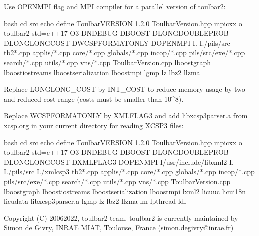 \documentclass[letterpaper,10pt,openany,oneside,english]{sphinxmanual}
\begin{document}
\sphinxAtStartPar
Use OPENMPI flag and MPI compiler for a parallel version of toulbar2:

\begin{sphinxVerbatim}[commandchars=\\\{\}]
bash
cd src
echo \PYGZsq{}\PYGZsh{}define Toulbar\PYGZus{}VERSION \PYGZdq{}1.2.0\PYGZdq{}\PYGZsq{} \PYGZgt{} ToulbarVersion.hpp
mpicxx \PYGZhy{}o toulbar2 \PYGZhy{}std=c++17 \PYGZhy{}O3 \PYGZhy{}DNDEBUG \PYGZhy{}DBOOST \PYGZhy{}DLONGDOUBLE\PYGZus{}PROB \PYGZhy{}DLONGLONG\PYGZus{}COST \PYGZhy{}DWCSPFORMATONLY \PYGZhy{}DOPENMPI \PYGZbs{}
 \PYGZhy{}I. \PYGZhy{}I./pils/src tb2*.cpp applis/*.cpp core/*.cpp globals/*.cpp incop/*.cpp pils/src/exe/*.cpp search/*.cpp utils/*.cpp vns/*.cpp ToulbarVersion.cpp \PYGZbs{}
 \PYGZhy{}lboost\PYGZus{}graph \PYGZhy{}lboost\PYGZus{}iostreams \PYGZhy{}lboost\PYGZus{}serialization \PYGZhy{}lboost\PYGZus{}mpi \PYGZhy{}lgmp \PYGZhy{}lz \PYGZhy{}lbz2 \PYGZhy{}llzma
\end{sphinxVerbatim}

\sphinxAtStartPar
Replace LONGLONG\_COST by INT\_COST to reduce memory usage by two and reduced cost range (costs must be smaller than 10\textasciicircum{}8).

\sphinxAtStartPar
Replace WCSPFORMATONLY by XMLFLAG3 and add libxcsp3parser.a from xcsp.org in your current directory for reading XCSP3 files:

\begin{sphinxVerbatim}[commandchars=\\\{\}]
bash
cd src
echo \PYGZsq{}\PYGZsh{}define Toulbar\PYGZus{}VERSION \PYGZdq{}1.2.0\PYGZdq{}\PYGZsq{} \PYGZgt{} ToulbarVersion.hpp
mpicxx \PYGZhy{}o toulbar2 \PYGZhy{}std=c++17 \PYGZhy{}O3 \PYGZhy{}DNDEBUG \PYGZhy{}DBOOST \PYGZhy{}DLONGDOUBLE\PYGZus{}PROB \PYGZhy{}DLONGLONG\PYGZus{}COST \PYGZhy{}DXMLFLAG3 \PYGZhy{}DOPENMPI \PYGZbs{}
 \PYGZhy{}I/usr/include/libxml2 \PYGZhy{}I. \PYGZhy{}I./pils/src \PYGZhy{}I./xmlcsp3 tb2*.cpp applis/*.cpp core/*.cpp globals/*.cpp incop/*.cpp pils/src/exe/*.cpp search/*.cpp utils/*.cpp vns/*.cpp ToulbarVersion.cpp \PYGZbs{}
 \PYGZhy{}lboost\PYGZus{}graph \PYGZhy{}lboost\PYGZus{}iostreams \PYGZhy{}lboost\PYGZus{}serialization \PYGZhy{}lboost\PYGZus{}mpi \PYGZhy{}lxml2 \PYGZhy{}licuuc \PYGZhy{}licui18n \PYGZhy{}licudata libxcsp3parser.a \PYGZhy{}lgmp \PYGZhy{}lz \PYGZhy{}lbz2 \PYGZhy{}llzma \PYGZhy{}lm \PYGZhy{}lpthread \PYGZhy{}ldl
\end{sphinxVerbatim}

\sphinxAtStartPar
Copyright (C) 2006\sphinxhyphen{}2022, toulbar2 team.
toulbar2 is currently maintained by Simon de Givry, INRAE \sphinxhyphen{} MIAT, Toulouse, France (simon.de\sphinxhyphen{}givry@inrae.fr)
\end{document}
